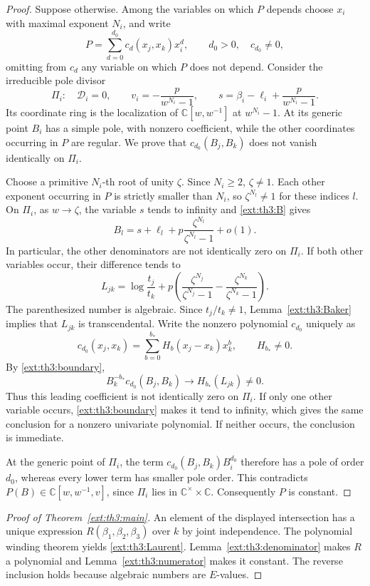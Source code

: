 \documentclass[11pt,a4paper]{article}
\theoremstyle{definition}\newtheorem{definition}[theorem]{Definition}
\theoremstyle{remark}\newtheorem{remark}[theorem]{Remark}
\begin{document}
\begin{proof}
Suppose otherwise.  Among the variables on which $P$ depends choose
$x_i$ with maximal exponent $N_i$, and write
\[
 P=\sum_{d=0}^{d_0}c_d(x_j,x_k)x_i^d,
 \qquad d_0>0,\quad c_{d_0}\ne0,
\]
omitting from $c_d$ any variable on which $P$ does not depend.
Consider the irreducible pole divisor
\[
 \Pi_i:\quad \mathcal D_i=0,\qquad
 v_i=-\frac{p}{w^{N_i}-1},\qquad
 s=\beta_i-\ell_i+\frac{p}{w^{N_i}-1}.
\]
Its coordinate ring is the localization of $\mathbb C[w,w^{-1}]$ at
$w^{N_i}-1$.  At its generic point $B_i$ has a simple pole, with nonzero
coefficient, while the other coordinates occurring in $P$ are regular.
We prove that $c_{d_0}(B_j,B_k)$ does not vanish identically on $\Pi_i$.

Choose a primitive $N_i$-th root of unity $\zeta$.  Since $N_i\ge2$,
$\zeta\ne1$.  Each other exponent occurring in $P$ is strictly smaller
than $N_i$, so $\zeta^{N_l}\ne1$ for these indices $l$.
On $\Pi_i$, as $w\to\zeta$, the variable $s$ tends to infinity and
\eqref{ext:th3:B} gives
\begin{equation}\label{ext:th3:boundary}
 B_l=s+\ell_l+
 p\frac{\zeta^{N_l}}{\zeta^{N_l}-1}+o(1).
\end{equation}
In particular, the other denominators are not identically zero on
$\Pi_i$.  If both other variables occur, their difference tends to
\[
 L_{jk}=\log\frac{t_j}{t_k}
  +p\left(\frac{\zeta^{N_j}}{\zeta^{N_j}-1}
           -\frac{\zeta^{N_k}}{\zeta^{N_k}-1}\right).
\]
The parenthesized number is algebraic.  Since $t_j/t_k\ne1$,
Lemma~\ref{ext:th3:Baker} implies that $L_{jk}$ is transcendental.
Write the nonzero polynomial $c_{d_0}$ uniquely as
\[
 c_{d_0}(x_j,x_k)=\sum_{b=0}^{b_*}H_b(x_j-x_k)x_k^b,
 \qquad H_{b_*}\ne0.
\]
By \eqref{ext:th3:boundary},
\[
 B_k^{-b_*}c_{d_0}(B_j,B_k)\longrightarrow H_{b_*}(L_{jk})\ne0.
\]
Thus this leading coefficient is not identically zero on $\Pi_i$.
If only one other variable occurs, \eqref{ext:th3:boundary} makes it tend
to infinity, which gives the same conclusion for a nonzero univariate
polynomial.  If neither occurs, the conclusion is immediate.

At the generic point of $\Pi_i$, the term
$c_{d_0}(B_j,B_k)B_i^{d_0}$ therefore has a pole of order $d_0$,
whereas every lower term has smaller pole order.  This contradicts
$P(B)\in\mathbb C[w,w^{-1},v]$, since $\Pi_i$ lies in
$\mathbb C^\times\times\mathbb C$.  Consequently $P$ is constant.
\end{proof}

\begin{proof}[Proof of Theorem~\ref{ext:th3:main}]
An element of the displayed intersection has a unique expression
$R(\beta_1,\beta_2,\beta_3)$ over $k$ by joint independence.
The polynomial winding theorem yields \eqref{ext:th3:Laurent}.
Lemma~\ref{ext:th3:denominator} makes $R$ a polynomial and
Lemma~\ref{ext:th3:numerator} makes it constant.  The reverse inclusion holds
because algebraic numbers are $E$-values.
\end{proof}
\end{document}
